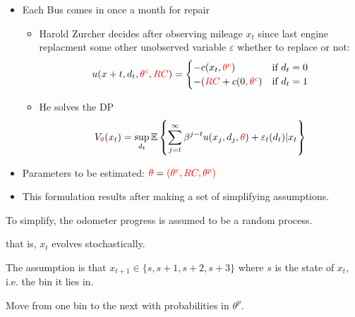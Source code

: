 \documentclass[english]{beamer}
\begin{document}
\begin{frame}{\cite{rustbus}}
\begin{itemize}
\item Each Bus comes in once a month for repair
\begin{itemize}
\item Harold Zurcher decides after observing mileage $x_t$ since last engine replacment  some other unobserved variable $\varepsilon$ whether to replace or not:
\begin{equation*}
u(x+t,d_t,{\color{red}{\theta^c}},{\color{red}{RC}}) = \begin{cases}-c(x_t,{\color{red}{\theta^c}}) & \text{if }d_t=0 \\ 
                                                  -({\color{red}{RC}} + c(0,{\color{red}{\theta^c}}) & \text{if }d_t=1
  \end{cases}
\end{equation*}

\item He solves the DP
\begin{equation*}
V_{\color{red}{\theta}}(x_t) = \sup_{d_t} \mathbb{E}\left\{ \sum_{j=t}^\infty \beta^{j-t} u(x_j,d_j,{\color{red}{\theta}}) + \varepsilon_t(d_t) |x_t \right\}
\end{equation*}
\end{itemize}
\item Parameters to be estimated: ${\color{red}{\theta}} = {\color{red}{(\theta^c,RC,\theta^p)}}$
\item This formulation results after making a set of simplifying assumptions.
\end{itemize}
\end{frame}


\begin{frame}{\cite{rustbus}}
\begin{midi}
\item To simplify, the odometer progress is assumed to be a random process.
\item that is, $x_t$ evolves stochastically.
\item The assumption is that $x_{t+1}\in\{s,s+1,s+2,s+3\}$ where $s$ is the state of $x_t$, i.e. the bin it lies in. 
\item Move from one bin to the next with probabilities in $\theta^p$.
\end{midi}

\end{frame}
	
\end{document}
